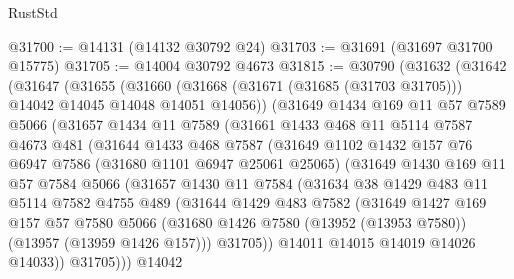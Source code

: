 \begin{lexlean}{RustStd}
\begin{coremodule}
@31700 := @14131 (@14132 @30792 @24)
@31703 := @31691 (@31697 @31700 @15775)
@31705 := @14004 @30792 @4673
@31815 := @30790
    (@31632
      (@31642
        (@31647
          (@31655
            (@31660 (@31668 (@31671 (@31685 (@31703 @31705))) @14042 @14045 @14048 @14051 @14056))
            (@31649
              @1434
              @169
              @11
              @57
              @7589
              @5066
              (@31657
                @1434
                @11
                @7589
                (@31661
                  @1433
                  @468
                  @11
                  @5114
                  @7587
                  @4673
                  @481
                  (@31644
                    @1433
                    @468
                    @7587
                    (@31649
                      @1102
                      @1432
                      @157
                      @76
                      @6947
                      @7586
                      (@31680 @1101 @6947 @25061 @25065)
                      (@31649
                        @1430
                        @169
                        @11
                        @57
                        @7584
                        @5066
                        (@31657
                          @1430
                          @11
                          @7584
                          (@31634
                            @38
                            @1429
                            @483
                            @11
                            @5114
                            @7582
                            @4755
                            @489
                            (@31644
                              @1429
                              @483
                              @7582
                              (@31649
                                @1427
                                @169
                                @157
                                @57
                                @7580
                                @5066
                                (@31680
                                  @1426
                                  @7580
                                  (@13952 (@13953 @7580))
                                  (@13957 (@13959 @1426 @157)))
                                @31705))
                            @14011
                            @14015
                            @14019
                            @14026
                            @14033))
                        @31705)))
                  @14042

\end{coremodule}
\end{lexlean}
